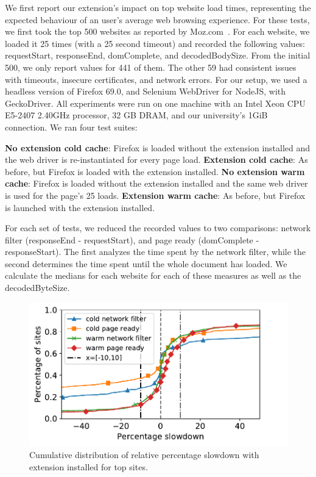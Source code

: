 We first report our extension's impact on top website load times,
representing the expected behaviour of an user's average web browsing
experience. For these tests, we first took the top 500 websites as
reported by Moz.com~\cite{top500}. For each website, we loaded it 25
times (with a 25 second timeout) and recorded the following values:
requestStart, responseEnd, domComplete, and decodedBodySize. From the
initial 500, we only report values for 441 of them. The other 59 had
consistent issues with timeouts, insecure certificates, and network
errors. For our setup, we used a headless version of Firefox 69.0, and
Selenium WebDriver for NodeJS, with GeckoDriver. All experiments were
run on one machine with an Intel Xeon CPU E5-2407 2.40GHz processor,
32 GB DRAM, and our university's 1GiB connection. We ran four test
suites:

	\textbf{No extension cold cache}: Firefox is loaded without the extension installed and the web driver is re-instantiated for every page load.
	\textbf{Extension cold cache}: As before, but Firefox is loaded with the extension installed.
	\textbf{No extension warm cache}: Firefox is loaded without the extension installed and the same web driver is used for the page's 25 loads.
	\textbf{Extension warm cache}: As before, but Firefox is launched with the extension installed.


For each set of tests, we reduced the recorded values to two comparisons: network filter (responseEnd - requestStart), and page ready (domComplete - responseStart). The first analyzes the time spent by the network filter, while the second determines the time spent until the whole document has loaded. We calculate the medians for each website for each of these measures as well as the decodedByteSize.

\begin{figure}[h]
		\begin{center}
	\includegraphics[scale=0.5]{results/extension_slowdown_overall_small.pdf}
	\caption{Cumulative distribution of relative percentage slowdown with extension installed for top sites.}
	\label{fig:overall_slowdown}
\end{center}
	
\end{figure}

